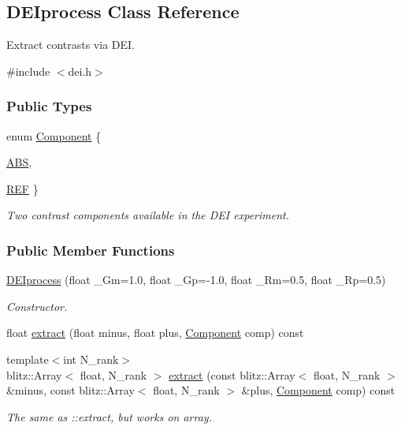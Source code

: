 \hypertarget{classDEIprocess}{
\subsection{DEIprocess Class Reference}
\label{classDEIprocess}
}


Extract contrasts via DEI.  




{\ttfamily \#include $<$dei.h$>$}

\subsubsection*{Public Types}
\begin{DoxyCompactItemize}
\item 
enum \hyperlink{classDEIprocess_a3a41867d8f9d10e77541ae8484256cd2}{Component} \{ \par
\hyperlink{classDEIprocess_a3a41867d8f9d10e77541ae8484256cd2a2660890e65c78cc5d8591eee478139b7}{ABS}, 
\par
\hyperlink{classDEIprocess_a3a41867d8f9d10e77541ae8484256cd2a0a2d550a1d62db99452cf74ffc29416e}{REF}
 \}
\begin{DoxyCompactList}\small\item\em Two contrast components available in the DEI experiment. \item\end{DoxyCompactList}\end{DoxyCompactItemize}
\subsubsection*{Public Member Functions}
\begin{DoxyCompactItemize}
\item 
\hyperlink{group__deiedei_ga200349bd8faedf51792d17acf1bb90e5}{DEIprocess} (float \_\-Gm=1.0, float \_\-Gp=-\/1.0, float \_\-Rm=0.5, float \_\-Rp=0.5)
\begin{DoxyCompactList}\small\item\em Constructor. \item\end{DoxyCompactList}\item 
float \hyperlink{group__deiedei_ga01cf5896cf83f5c4fd778f78097b2a4d}{extract} (float minus, float plus, \hyperlink{classDEIprocess_a3a41867d8f9d10e77541ae8484256cd2}{Component} comp) const 
\item 
{\footnotesize template$<$int N\_\-rank$>$ }\\blitz::Array$<$ float, N\_\-rank $>$ \hyperlink{group__deiedei_ga34485248b43395c10fc232f5f0b9ff2f}{extract} (const blitz::Array$<$ float, N\_\-rank $>$ \&minus, const blitz::Array$<$ float, N\_\-rank $>$ \&plus, \hyperlink{classDEIprocess_a3a41867d8f9d10e77541ae8484256cd2}{Component} comp) const 
\begin{DoxyCompactList}\small\item\em The same as ::extract, but works on array. \item\end{DoxyCompactList}\end{DoxyCompactItemize}
